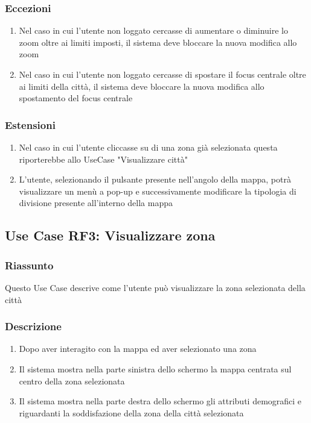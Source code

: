         \subsubsection{Eccezioni}
            \begin{enumerate}
                \item Nel caso in cui l'utente non loggato cercasse di aumentare o diminuire lo zoom oltre ai limiti imposti, il sistema deve bloccare la nuova modifica allo zoom
                \item Nel caso in cui l'utente non loggato cercasse di spostare il focus centrale oltre ai limiti della città, il sistema deve bloccare la nuova modifica allo spostamento del focus centrale
            \end{enumerate}
        \subsubsection{Estensioni}
            \begin{enumerate}
                \item Nel caso in cui l'utente cliccasse su di una zona già selezionata questa riporterebbe allo UseCase "Visualizzare città"
                \item L'utente, selezionando il pulsante presente nell'angolo della mappa, potrà visualizzare un menù a pop-up e successivamente modificare la tipologia di divisione presente all'interno della mappa
            \end{enumerate}
    
    \subsection{Use Case RF3: Visualizzare zona}
        \subsubsection{Riassunto}
            Questo Use Case descrive come l'utente può visualizzare la zona selezionata della città
        \subsubsection{Descrizione}
            \begin{enumerate}
                \item Dopo aver interagito con la mappa ed aver selezionato una zona
                \item Il sistema mostra nella parte sinistra dello schermo la mappa centrata sul centro della zona selezionata
                \item Il sistema mostra nella parte destra dello schermo gli attributi demografici e riguardanti la soddisfazione della zona della città selezionata
            \end{enumerate}

